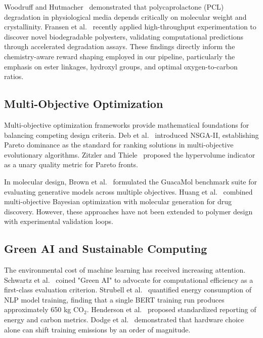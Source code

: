 \documentclass[twocolumn,10pt]{article}
\begin{document}
Woodruff and Hutmacher~\cite{woodruff2010return} demonstrated that polycaprolactone (PCL) degradation in physiological media depends critically on molecular weight and crystallinity. Fransen et al.~\cite{fransen2023pnas} recently applied high-throughput experimentation to discover novel biodegradable polyesters, validating computational predictions through accelerated degradation assays. These findings directly inform the chemistry-aware reward shaping employed in our pipeline, particularly the emphasis on ester linkages, hydroxyl groups, and optimal oxygen-to-carbon ratios.

\subsection{Multi-Objective Optimization}

Multi-objective optimization frameworks provide mathematical foundations for balancing competing design criteria. Deb et al.~\cite{deb2002nsga} introduced NSGA-II, establishing Pareto dominance as the standard for ranking solutions in multi-objective evolutionary algorithms. Zitzler and Thiele~\cite{zitzler2003hypervolume} proposed the hypervolume indicator as a unary quality metric for Pareto fronts.

In molecular design, Brown et al.~\cite{brown2019guacamol} formulated the GuacaMol benchmark suite for evaluating generative models across multiple objectives. Huang et al.~\cite{huang2021therapeutics} combined multi-objective Bayesian optimization with molecular generation for drug discovery. However, these approaches have not been extended to polymer design with experimental validation loops.

\subsection{Green AI and Sustainable Computing}

The environmental cost of machine learning has received increasing attention. Schwartz et al.~\cite{schwartz2020green} coined "Green AI" to advocate for computational efficiency as a first-class evaluation criterion. Strubell et al.~\cite{strubell2019energy} quantified energy consumption of NLP model training, finding that a single BERT training run produces approximately 650 kg CO$_2$. Henderson et al.~\cite{henderson2020towards} proposed standardized reporting of energy and carbon metrics. Dodge et al.~\cite{dodge2022measuring} demonstrated that hardware choice alone can shift training emissions by an order of magnitude.
\end{document}
